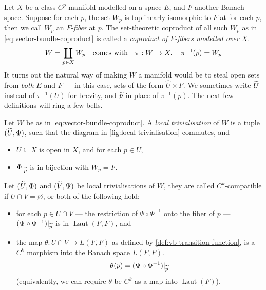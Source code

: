 \documentclass[../main-manifolds.tex]{subfiles}
\providecommand{\Laut}{\operatorname{Laut}}
\begin{document}
Let $X$ be a class $C^p$ manifold modelled on a space $E$, and $F$ another Banach space. Suppose for each $p$, the set $W_p$ is toplinearly isomorphic to $F$ at for each $p$, then we call $W_p$ an $F$-\emph{fiber} at $p$. The set-theoretic coproduct of all such $W_p$ as in \cref{eq:vector-bundle-coproduct} is called a \emph{coproduct of $F$-fibers modelled over $X$}.
\begin{equation}\label{eq:vector-bundle-coproduct}
    W = \coprod_{p\in X}W_p\qqtext{comes with} \pi: W\to X,\quad \pi^{-1}(p) = W_p
\end{equation}
 It turns out the natural way of making $W$ a manifold would be to steal open sets from \emph{both} $E$ and $F$ --- in this case, sets of the form $\hat{U}\times F$. We sometimes write $\widetilde{U}$ instead of $\pi^{-1}(U)$ for brevity, and $\widetilde{p}$ in place of $\pi^{-1}(p)$. The next few definitions will ring a few bells.
%
%
\begin{definition}\label{def:local-trivialisation}
    Let $W$ be as in \cref{eq:vector-bundle-coproduct}. A \emph{local trivialisation} of $W$ is a tuple $(\widetilde{U}, \Phi)$, such that the diagram in \cref{fig:local-trivialisation} commutes, and
    \begin{itemize}
        \item $U\subseteq X$ is open in $X$, and for each $p\in U$,
        \item $\Phi\vert_{\widetilde{p}}$ is in bijection with $W_p = F$.
    \end{itemize}
\end{definition}
%
%
\begin{definition}\label{def:compatibility-local-trivialisations}
    Let $(\widetilde{U},\Phi)$ and $(\widetilde{V},\Psi)$ be local trivialisations of $W$, they are called $C^k$-compatible if $U\cap V=\varnothing$, or both of the following hold:
    \begin{itemize}
        \item for each $p\in U\cap V$ --- the restriction of $\Psi\circ\Phi^{-1}$ onto the fiber of $p$ --- $(\Psi\circ\Phi^{-1})\vert_{\widetilde{p}}$ is in $\Laut(F,F)$, and
        \item the map $\theta: U\cap V\to L(F,F)$ as defined by \cref{def:vb-transition-function}, is a $C^k$ morphism into the Banach space $L(F,F)$.
        \begin{equation}\label{def:vb-transition-function}
            \theta(p) = (\Psi\circ\Phi^{-1})\vert_{\widetilde{p}}
        \end{equation}
        (equivalently, we can require $\theta$ be $C^k$ as a map into $\Laut(F)$).
    \end{itemize}
\end{definition}
\end{document}
